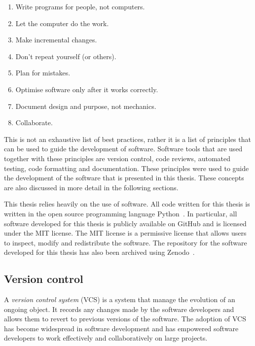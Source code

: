 \begin{enumerate}
    \item Write programs for people, not computers. \label{best_practice_1}
    \item Let the computer do the work. \label{best_practice_2}
    \item Make incremental changes. \label{best_practice_3}
    \item Don't repeat yourself (or others). \label{best_practice_4}
    \item Plan for mistakes. \label{best_practice_5}
    \item Optimise software only after it works correctly.
    \label{best_practice_6}
    \item Document design and purpose, not mechanics. \label{best_practice_7}
    \item Collaborate. \label{best_practice_8}
\end{enumerate}

This is not an exhaustive list of best practices, rather it is a list of
principles that can be used to guide the development of software.
Software tools that are used together with these principles are version control,
code reviews, automated testing, code formatting and documentation.
These principles were used to guide the development of the software that is
presented in this thesis.
These concepts are also discussed in more detail in the following sections.

This thesis relies heavily on the use of software.
All code written for this thesis is written in the open source programming
language Python~\cite{van1995python}.
In particular, all software developed for this thesis is publicly available on
GitHub and is licensed under the MIT license.
The MIT license is a permissive license that allows users to inspect, modify
and redistribute the software.
The repository for the software developed for this thesis has also been
archived using Zenodo~\cite{ambulance_game_github_repo}.


\subsection{Version control}

A \textit{version control system} (VCS) is a system that manage the evolution of
an ongoing object.
It records any changes made by the software developers and allows them to
revert to previous versions of the software.
The adoption of VCS has become widespread in software development and has
empowered software developers to work effectively and collaboratively on large
projects.

